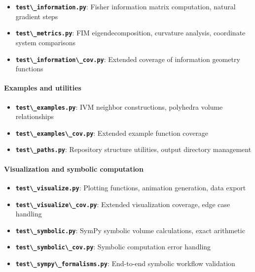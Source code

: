\documentclass[
  10pt,
]{article}
\newcommand{\passthrough}[1]{#1}
\providecommand{\tightlist}{%
  \setlength{\itemsep}{0pt}\setlength{\parskip}{0pt}}
\begin{document}
\begin{itemize}
\tightlist
\item
  \textbf{\passthrough{\lstinline!test\_information.py!}}: Fisher
  information matrix computation, natural gradient steps
\item
  \textbf{\passthrough{\lstinline!test\_metrics.py!}}: FIM
  eigendecomposition, curvature analysis, coordinate system comparisons
\item
  \textbf{\passthrough{\lstinline!test\_information\_cov.py!}}: Extended
  coverage of information geometry functions
\end{itemize}

\paragraph{Examples and utilities}\label{examples-and-utilities}

\begin{itemize}
\tightlist
\item
  \textbf{\passthrough{\lstinline!test\_examples.py!}}: IVM neighbor
  constructions, polyhedra volume relationships
\item
  \textbf{\passthrough{\lstinline!test\_examples\_cov.py!}}: Extended
  example function coverage
\item
  \textbf{\passthrough{\lstinline!test\_paths.py!}}: Repository
  structure utilities, output directory management
\end{itemize}

\paragraph{Visualization and symbolic
computation}\label{visualization-and-symbolic-computation}

\begin{itemize}
\tightlist
\item
  \textbf{\passthrough{\lstinline!test\_visualize.py!}}: Plotting
  functions, animation generation, data export
\item
  \textbf{\passthrough{\lstinline!test\_visualize\_cov.py!}}: Extended
  visualization coverage, edge case handling
\item
  \textbf{\passthrough{\lstinline!test\_symbolic.py!}}: SymPy symbolic
  volume calculations, exact arithmetic
\item
  \textbf{\passthrough{\lstinline!test\_symbolic\_cov.py!}}: Symbolic
  computation error handling
\item
  \textbf{\passthrough{\lstinline!test\_sympy\_formalisms.py!}}:
  End-to-end symbolic workflow validation
\end{itemize}
\end{document}
